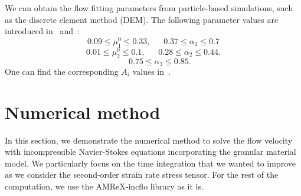 We can obtain the flow fitting parameters from particle-based simulations, such as the discrete element method (DEM). The following parameter values are introduced in~\cite{jop_constitutive_2006} and~\cite{srivastava_viscometric_2021}:
    \[
    0.09 \leq \mu_1^0 \leq 0.33, 
    \ \ \ \ \ \ \ 
    0.37 \leq \alpha_1 \leq 0.7
    \]
        \[
    0.01 \leq \mu_2^0 \leq 0.1, 
    \ \ \ \ \ \ \ 
    0.28 \leq \alpha_2 \leq 0.44.
    \]
            \[
    \ \ \ \ \ \ \ 
    0.75 \leq \alpha_3 \leq 0.85.
    \]
     One can find the corresponding $A_i$ values in~\cite{srivastava_viscometric_2021}.

\section{Numerical method}
In this section, we demonstrate the numerical method to solve the flow velocity with incompressible Navier-Stokes equations incorporating the granular material model. We particularly focus on the time integration that we wanted to improve as we consider the second-order strain rate stress tensor.
For the rest of the computation, we use the AMReX-incflo library as it is.
